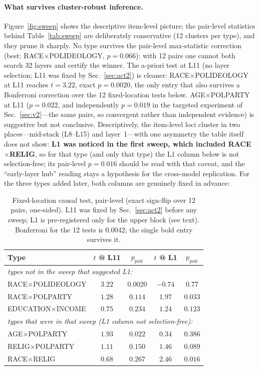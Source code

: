 \paragraph{What survives cluster-robust inference.}
Figure~\ref{fig:sweep} shows the descriptive item-level picture; the
pair-level statistics behind Table~\ref{tab:sweep} are deliberately
conservative (12 clusters per type), and they prune it sharply. No type survives the pair-level max-statistic
correction (best: RACE$\times$POLIDEOLOGY, $p=0.066$): with 12 pairs one
cannot both search 32 layers and certify the winner. The a-priori test at L11 (no layer selection; L11 was fixed
by Sec.~\ref{sec:act2}) is cleaner:
RACE$\times$POLIDEOLOGY at L11 reaches $t=3.22$, exact $p=0.0020$, the
only entry that also survives a Bonferroni correction over the 12
fixed-location tests below. AGE$\times$POLPARTY at L11 ($p=0.022$, and
independently $p=0.019$ in the targeted experiment of
Sec.~\ref{sec:v2}---the same pairs, so convergent rather than
independent evidence) is suggestive but not conclusive. Descriptively,
the item-level loci cluster in two places---mid-stack (L8--L15) and
layer~1---with one asymmetry the table itself does not show:
\textbf{L1 was noticed in the first sweep, which included
RACE$\times$RELIG}, so for that type (and only that type) the L1 column
below is not selection-free; its pair-level $p=0.016$ should be read
with that caveat, and the ``early-layer hub'' reading stays a hypothesis
for the cross-model replication. For the three types added later, both
columns are genuinely fixed in advance:

\begin{table}[h]
\centering
\caption{Fixed-location causal test, pair-level (exact sign-flip over 12
pairs, one-sided). L11 was fixed by Sec.~\ref{sec:act2} before any
sweep; L1 is pre-registered only for the upper block (see text).
Bonferroni for the 12 tests is $0.0042$; the single bold entry survives
it.}
\label{tab:fixedlayer}
\begin{tabular}{lcccc}
\toprule
Type & $t$ @ L11 & $p_{\text{pair}}$ & $t$ @ L1 & $p_{\text{pair}}$ \\
\midrule
\multicolumn{5}{l}{\emph{types not in the sweep that suggested L1:}} \\
RACE$\times$POLIDEOLOGY  & $\mathbf{3.22}$ & $\mathbf{0.0020}$ & $-0.74$ & $0.77$ \\
RACE$\times$POLPARTY     & $1.28$ & $0.114$ & $1.97$ & $0.033$ \\
EDUCATION$\times$INCOME  & $0.75$ & $0.234$ & $1.24$ & $0.123$ \\
\midrule
\multicolumn{5}{l}{\emph{types that were in that sweep (L1 column not selection-free):}} \\
AGE$\times$POLPARTY      & $1.93$ & $0.022$ & $0.34$ & $0.386$ \\
RELIG$\times$POLPARTY    & $1.11$ & $0.150$ & $1.46$ & $0.089$ \\
RACE$\times$RELIG        & $0.68$ & $0.267$ & $2.46$ & $0.016$ \\
\bottomrule
\end{tabular}
\end{table}

